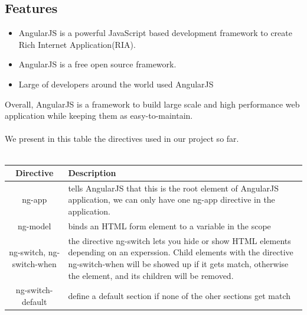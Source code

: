 \documentclass[12pt]{article}
\begin{document}
	\subsection{Features}
	\begin{itemize}
		\item AngularJS is a powerful JavaScript based development framework to create Rich Internet Application(RIA).
		\item AngularJS is a free open source framework.
		\item Large of developers around the world used AngularJS
	\end{itemize}
		Overall, AngularJS is a framework to build large scale and high performance web application while keeping them as easy-to-maintain.
		\\
		\\
		We present in this table the directives used in our project so far.
		\\
		\\
		\begin{table}
				\centering
			\begin{tabular}{|c|p{10cm}|}	
				\hline
				\textbf{Directive} & \textbf{Description }\\
				\hline
				ng-app & tells AngularJS that this is the root element of AngularJS application, we can only have one ng-app directive in the application.
				\\
				ng-model & binds an HTML form element to a variable in the scope  \\
				ng-switch, ng-switch-when & the directive ng-switch lets you hide or show HTML elements depending on an experssion. Child elements with the directive ng-switch-when will be showed up if it gets match, otherwise the element, and its children will be removed.
				\\
				ng-switch-default & define a default section if none of the oher sections get match\\ 
					
				\hline
			\end{tabular} 
		\end{table}
	
\end{document}
